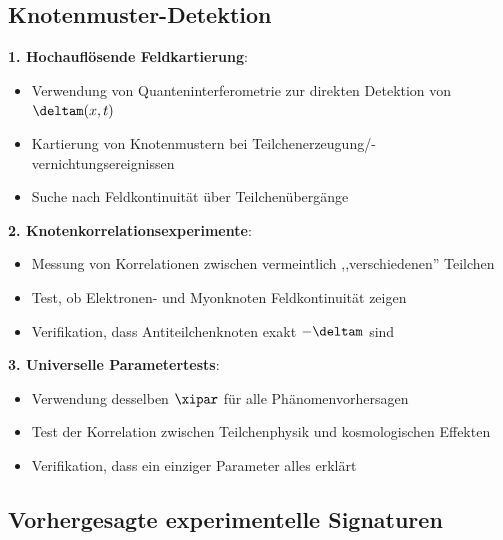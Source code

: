 	\subsection{Knotenmuster-Detektion}
	
	\textbf{1. Hochauflösende Feldkartierung}:
	\begin{itemize}
		\item Verwendung von Quanteninterferometrie zur direkten Detektion von $\deltam(x,t)$
		\item Kartierung von Knotenmustern bei Teilchenerzeugung/-vernichtungsereignissen
		\item Suche nach Feldkontinuität über Teilchenübergänge
	\end{itemize}
	
	\textbf{2. Knotenkorrelationsexperimente}:
	\begin{itemize}
		\item Messung von Korrelationen zwischen vermeintlich ,,verschiedenen'' Teilchen
		\item Test, ob Elektronen- und Myonknoten Feldkontinuität zeigen
		\item Verifikation, dass Antiteilchenknoten exakt $-\deltam$ sind
	\end{itemize}
	
	\textbf{3. Universelle Parametertests}:
	\begin{itemize}
		\item Verwendung desselben $\xipar$ für alle Phänomenvorhersagen
		\item Test der Korrelation zwischen Teilchenphysik und kosmologischen Effekten
		\item Verifikation, dass ein einziger Parameter alles erklärt
	\end{itemize}
	
	\subsection{Vorhergesagte experimentelle Signaturen}
	
	\begin{table}[htbp]
		\centering
		\caption{Vorhergesagte experimentelle Signaturen der Knotentheorie}
		\label{tab:experimental_signatures}
	\end{table}
	
